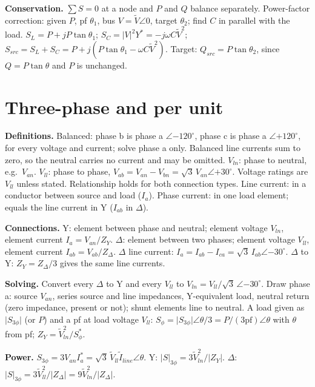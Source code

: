 \documentclass{article}
\newcommand{\abs}[1]{\lvert#1\rvert}
\begin{document}
\textbf{Conservation.}
$\sum S = 0$ at a node and $P$ and $Q$ balance separately.
Power-factor correction: given $P$, pf $\theta_1$, bus $V = \tilde V\angle0$, target $\theta_2$; find $C$ in parallel with the load.
$S_L = P + jP\tan\theta_1$; $S_C = \abs V^2 Y^* = -j\omega C\tilde V^2$; $S_{src} = S_L + S_C = P + j(P\tan\theta_1 - \omega C\tilde V^2)$.
Target: $Q_{src} = P\tan\theta_2$, since $Q = P\tan\theta$ and $P$ is unchanged.




\section{Three-phase and per unit}
\textbf{Definitions.}
Balanced: phase b is phase a $\angle{-120^\circ}$, phase c is phase a $\angle{+120^\circ}$, for every voltage and current; solve phase a only.
Balanced line currents sum to zero, so the neutral carries no current and may be omitted.
$V_{ln}$: phase to neutral, e.g.\ $V_{an}$.
$V_{ll}$: phase to phase, $V_{ab} = V_{an} - V_{bn} = \sqrt3\,V_{an}\angle{+30^\circ}$.
Voltage ratings are $V_{ll}$ unless stated. Relationship holds for both connection types.
Line current: in a conductor between source and load ($I_a$).
Phase current: in one load element; equals the line current in Y ($I_{ab}$ in $\Delta$).

\textbf{Connections.}
Y: element between phase and neutral; element voltage $V_{ln}$, element current $I_a = V_{an}/Z_Y$.
$\Delta$: element between two phases; element voltage $V_{ll}$, element current $I_{ab} = V_{ab}/Z_\Delta$.
$\Delta$ line current: $I_a = I_{ab} - I_{ca} = \sqrt3\,I_{ab}\angle{-30^\circ}$.
$\Delta$ to Y: $Z_Y = Z_\Delta/3$ gives the same line currents.

\textbf{Solving.}
Convert every $\Delta$ to Y and every $V_{ll}$ to $V_{ln} = V_{ll}/\sqrt3\,\angle{-30^\circ}$.
Draw phase a: source $V_{an}$, series source and line impedances, Y-equivalent load, neutral return (zero impedance, present or not); shunt elements line to neutral.
A load given as $\abs{S_{3\phi}}$ (or $P$) and a pf at load voltage $V_{ll}$: $S_\phi = \abs{S_{3\phi}}\angle\theta/3 = P/(3\text{pf})\angle\theta$ with $\theta$ from pf; $Z_Y = \tilde V_{ln}^2/S_\phi^*$.

\textbf{Power.}
$S_{3\phi} = 3V_{an}I_a^* = \sqrt3\,\tilde V_{ll}\tilde I_{line}\angle\theta$.
Y: $\abs S_{3\phi} = 3\tilde V_{ln}^2/\abs{Z_Y}$. $\Delta$: $\abs S_{3\phi} = 3\tilde V_{ll}^2/\abs{Z_\Delta} = 9\tilde V_{ln}^2/\abs{Z_\Delta}$.
\end{document}
